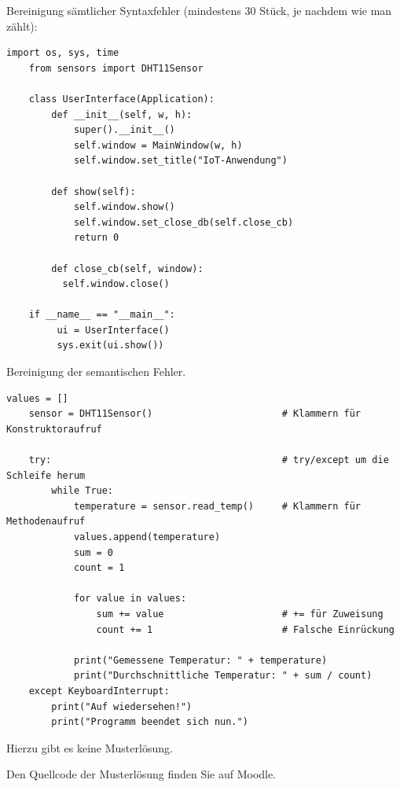 \teilaufgabe
Bereinigung sämtlicher Syntaxfehler (mindestens 30 Stück, je nachdem wie man zählt):

\begin{Verbatim}[gobble=4]
    import os, sys, time
    from sensors import DHT11Sensor

    class UserInterface(Application):
        def __init__(self, w, h):
            super().__init__()
            self.window = MainWindow(w, h)
            self.window.set_title("IoT-Anwendung")

        def show(self):
            self.window.show()
            self.window.set_close_db(self.close_cb)
            return 0

        def close_cb(self, window):
          self.window.close()

    if __name__ == "__main__":
         ui = UserInterface()
         sys.exit(ui.show())
\end{Verbatim}

\teilaufgabe
Bereinigung der semantischen Fehler.

\begin{Verbatim}[gobble=4]
    values = []
    sensor = DHT11Sensor()                       # Klammern für Konstruktoraufruf

    try:                                         # try/except um die Schleife herum
        while True:
            temperature = sensor.read_temp()     # Klammern für Methodenaufruf
            values.append(temperature)
            sum = 0
            count = 1

            for value in values:
                sum += value                     # += für Zuweisung
                count += 1                       # Falsche Einrückung

            print("Gemessene Temperatur: " + temperature)
            print("Durchschnittliche Temperatur: " + sum / count)
    except KeyboardInterrupt:
        print("Auf wiedersehen!")
        print("Programm beendet sich nun.")
\end{Verbatim}

Hierzu gibt es keine Musterlösung. \smiley

Den Quellcode der Musterlösung finden Sie auf Moodle.
